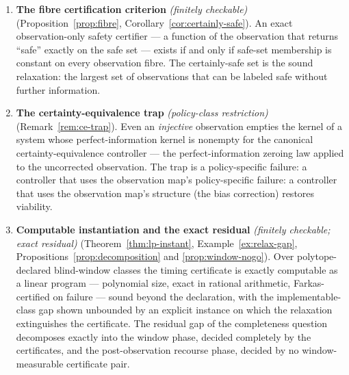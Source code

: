 \documentclass[10pt,twocolumn]{article}
\theoremstyle{definition}
\begin{document}
\begin{enumerate}
  full information. The mechanism is admissibility --- the common-action
  obstruction of Theorem~\ref{thm:common-action} at minimal size --- and Example~\ref{ex:hidden-mode} gives the hidden-mode instance.
\item
  \textbf{The fibre certification criterion} \emph{(finitely checkable)} (Proposition~\ref{prop:fibre}, Corollary~\ref{cor:certainly-safe}).
  An exact observation-only safety certifier --- a function of the
  observation that returns ``safe'' exactly on the safe set --- exists
  if and only if safe-set membership is constant on every observation
  fibre. The certainly-safe set is the sound relaxation: the largest set
  of observations that can be labeled safe without further information.
\item
  \textbf{The certainty-equivalence trap} \emph{(policy-class restriction)} (Remark~\ref{rem:ce-trap}). Even an
  \emph{injective} observation empties the kernel of a system whose
  perfect-information kernel is nonempty for the canonical
  certainty-equivalence controller --- the perfect-information zeroing
  law applied to the uncorrected observation. The trap is a
  policy-specific failure: a controller that uses the observation map's
policy-specific failure: a controller that uses the observation map's
structure (the bias correction) restores viability.
\item
  \textbf{Computable instantiation and the exact residual} \emph{(finitely checkable;
  exact residual)} (Theorem~\ref{thm:lp-instant}, Example~\ref{ex:relax-gap},
  Propositions~\ref{prop:decomposition} and \ref{prop:window-nogo}). Over
  polytope-declared blind-window classes the timing certificate is exactly
  computable as a linear program --- polynomial size, exact in rational
  arithmetic, Farkas-certified on failure --- sound beyond the declaration,
  with the implementable-class gap shown unbounded by an explicit instance on
  which the relaxation extinguishes the certificate. The residual gap of the
  completeness question decomposes exactly into the window phase, decided
  completely by the certificates, and the post-observation recourse phase,
  decided by no window-measurable certificate pair.
\end{enumerate}
\end{document}
